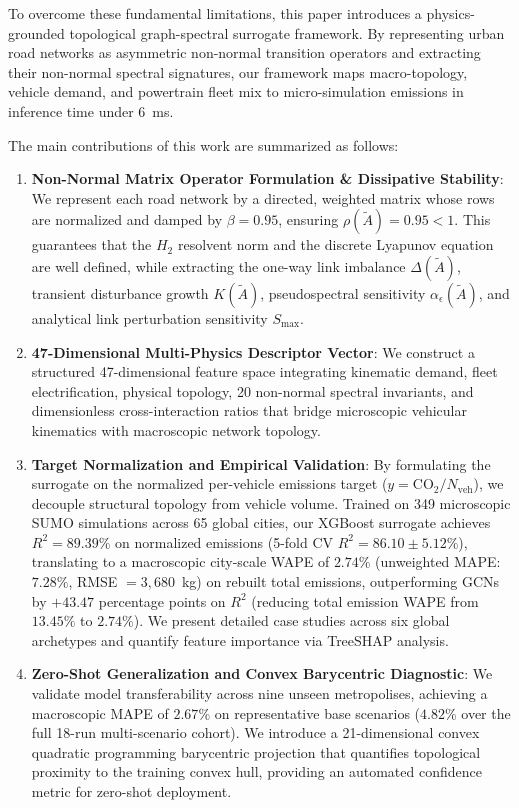 \documentclass[journal]{IEEEtran}
\begin{document}
To overcome these fundamental limitations, this paper introduces a physics-grounded topological graph-spectral surrogate framework. By representing urban road networks as asymmetric non-normal transition operators and extracting their non-normal spectral signatures, our framework maps macro-topology, vehicle demand, and powertrain fleet mix to micro-simulation emissions in inference time under $6$~ms.

The main contributions of this work are summarized as follows:
\begin{enumerate}
    \item \textbf{Non-Normal Matrix Operator Formulation \& Dissipative Stability}: We represent each road network by a directed, weighted matrix whose rows are normalized and damped by $\beta = 0.95$, ensuring $\rho(\tilde{A}) = 0.95 < 1$. This guarantees that the $H_2$ resolvent norm and the discrete Lyapunov equation are well defined, while extracting the one-way link imbalance $\Delta(\tilde{A})$, transient disturbance growth $K(\tilde{A})$, pseudospectral sensitivity $\alpha_\epsilon(\tilde{A})$, and analytical link perturbation sensitivity $S_{\max}$.
    \item \textbf{47-Dimensional Multi-Physics Descriptor Vector}: We construct a structured 47-dimensional feature space integrating kinematic demand, fleet electrification, physical topology, 20 non-normal spectral invariants, and dimensionless cross-interaction ratios that bridge microscopic vehicular kinematics with macroscopic network topology.
    \item \textbf{Target Normalization and Empirical Validation}: By formulating the surrogate on the normalized per-vehicle emissions target ($y = \text{CO}_2 / N_{\text{veh}}$), we decouple structural topology from vehicle volume. Trained on 349 microscopic SUMO simulations across 65 global cities, our XGBoost surrogate achieves $R^2 = 89.39\%$ on normalized emissions (5-fold CV $R^2 = 86.10 \pm 5.12\%$), translating to a macroscopic city-scale WAPE of $2.74\%$ (unweighted MAPE: $7.28\%$, RMSE $= 3,680$~kg) on rebuilt total emissions, outperforming GCNs by $+43.47$ percentage points on $R^2$ (reducing total emission WAPE from $13.45\%$ to $2.74\%$). We present detailed case studies across six global archetypes and quantify feature importance via TreeSHAP analysis.
    \item \textbf{Zero-Shot Generalization and Convex Barycentric Diagnostic}: We validate model transferability across nine unseen metropolises, achieving a macroscopic MAPE of $2.67\%$ on representative base scenarios ($4.82\%$ over the full 18-run multi-scenario cohort). We introduce a 21-dimensional convex quadratic programming barycentric projection \cite{Boyd2004} that quantifies topological proximity to the training convex hull, providing an automated confidence metric for zero-shot deployment.

\end{enumerate}
\end{document}
